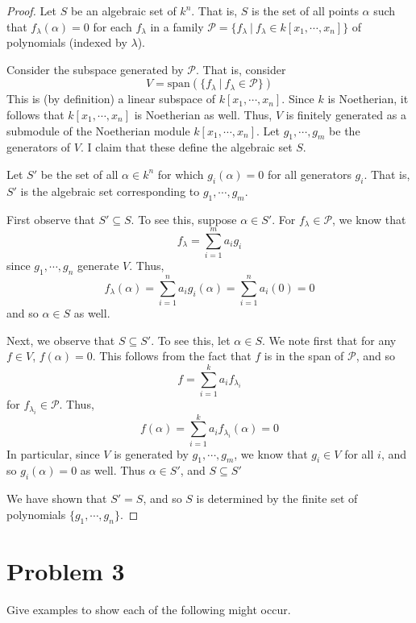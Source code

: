 \documentclass[12pt,reqno]{amsart}
\begin{document}
\begin{proof}
    Let $S$ be an algebraic set of $k^n$. That is, $S$ is the set of all points
    $\alpha$ such that $f_{\lambda}(\alpha)= 0$ for each $f_{\lambda}$ in a
    family $\mathscr{P}=\{f_{\lambda}\ |\ f_{\lambda}\in k[x_1,\cdots,x_n]\}$ of polynomials
    (indexed by $\lambda$).

    Consider the subspace generated by $\mathscr{P}$. That is, consider
    \[
        V = \text{span}(\{f_{\lambda}\ |\ f_{\lambda}\in \mathscr{P}\})
    \]
    This is (by definition) a linear subspace of $k[x_1,\cdots,x_n]$. Since $k$
    is Noetherian, it follows that $k[x_1,\cdots,x_n]$ is Noetherian as well.
    Thus, $V$ is finitely generated as a submodule of the Noetherian module
    $k[x_1,\cdots,x_n]$. Let $g_1,\cdots,g_m$ be the generators of $V$. I claim
    that these define the algebraic set $S$.

    Let $S'$ be the set of all $\alpha\in k^n$ for which $g_i(\alpha)=0$ for all
    generators $g_i$. That is, $S'$ is the algebraic set corresponding to
    $g_1,\cdots,g_m$. 
    
    First observe that $S'\subseteq S$. To see this, suppose
    $\alpha\in S'$. For $f_{\lambda}\in\mathscr{P}$, we know that
    \[
        f_{\lambda} = \sum_{i=1}^m a_ig_i
    \]
    since $g_1,\cdots,g_n$ generate $V$. Thus,
    \[
        f_{\lambda}(\alpha) = \sum_{i=1}^na_ig_i(\alpha) = \sum_{i=1}^na_i(0)=0
    \]
    and so $\alpha\in S$ as well.

    Next, we observe that $S\subseteq S'$. To see this, let $\alpha\in S$. We
    note first that for any $f\in V$, $f(\alpha) = 0$. This follows from the
    fact that $f$ is in the span of $\mathscr{P}$, and so
    \[
        f = \sum_{i=1}^k a_if_{\lambda_i}
    \]
    for $f_{\lambda_i}\in\mathscr{P}$. Thus,
    \[
        f(\alpha) = \sum_{i=1}^k a_if_{\lambda_i}(\alpha) = 0
    \]
    In particular, since $V$ is generated by $g_1,\cdots,g_m$, we know that
    $g_i\in V$ for all $i$, and so $g_i(\alpha)=0$ as well. Thus $\alpha\in S'$,
    and $S\subseteq S'$

    We have shown that $S'=S$, and so $S$ is determined by the finite set of
    polynomials $\{g_1,\cdots,g_n\}$.
\end{proof}


\newpage

\section*{Problem 3}
Give examples to show each of the following might occur.
\end{document}
